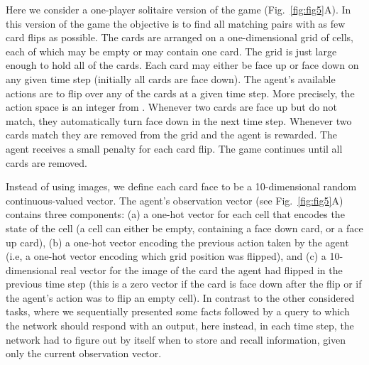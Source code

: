 \documentclass{article}
\begin{document}
Here we consider a one-player solitaire version of the game (Fig.~\ref{fig:fig5}A). In this version of the game the objective is to find all matching pairs with as few card flips as possible. The cards are arranged on a one-dimensional grid of cells, each of which may be empty or may contain one card. The grid is just large enough to hold all of the  cards. Each card may either be face up or face down on any given time step (initially all cards are face down). The agent's available actions are to flip over any of the cards at a given time step. More precisely, the action space is an integer from . Whenever two cards are face up but do not match, they automatically turn face down in the next time step. Whenever two cards match they are removed from the grid and the agent is rewarded. The agent receives a small penalty for each card flip. The game continues until all cards are removed.

Instead of using images, we define each card face to be a \num{10}-dimensional random continuous-valued vector.
The agent's observation vector  (see Fig.~\ref{fig:fig5}A) contains three components: (a) a one-hot vector for each cell that encodes the state of the cell (a cell can either be empty, containing a face down card, or a face up card), (b) a one-hot vector encoding the previous action taken by the agent (i.e, a one-hot vector encoding which grid position was flipped), and (c) a 10-dimensional real vector for the image of the card the agent had flipped in the previous time step (this is a zero vector if the card is face down after the flip or if the agent's action was to flip an empty cell). 
In contrast to the other considered tasks, where we sequentially presented some facts followed by a query to which the network should respond with an output, here instead, in each time step, the network had to figure out by itself when to store and recall information, given only the current observation vector.
\end{document}
